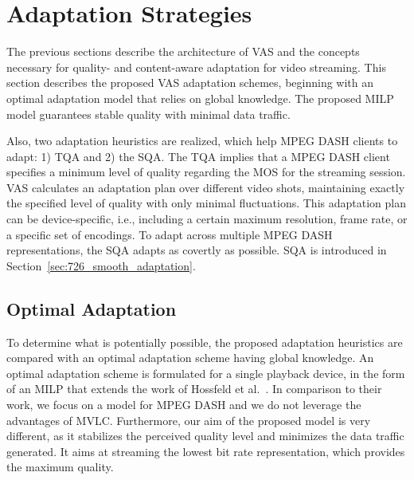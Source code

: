 \section{Adaptation Strategies}
\label{sec:726_adaptationstrategy}
The previous sections describe the architecture of \ac{VAS} and the concepts necessary for quality- and content-aware adaptation for video streaming.
This section describes the proposed \ac{VAS} adaptation schemes, beginning with an optimal adaptation model that relies on global knowledge.
The proposed \ac{MILP} model guarantees stable quality with minimal data traffic.

Also, two adaptation heuristics are realized, which help \ac{MPEG} \ac{DASH} clients to adapt: 1) \ac{TQA} and 2) the \ac{SQA}.
The \ac{TQA} implies that a \ac{MPEG} \ac{DASH} client specifies a minimum level of quality regarding the \ac{MOS} for the streaming session.
\ac{VAS} calculates an adaptation plan over different video shots, maintaining exactly the specified level of quality with only minimal fluctuations.
This adaptation plan can be device-specific, i.e., including a certain maximum resolution, frame rate, or a specific set of encodings.
To adapt across multiple \ac{MPEG} \ac{DASH} representations, the \acf{SQA} adapts as covertly as possible.
\ac{SQA} is introduced in Section~\ref{sec:726_smooth_adaptation}.
\subsection{Optimal Adaptation}
\label{sec:726_optimalAdaptation}
To determine what is potentially possible, the proposed adaptation heuristics are compared with an optimal adaptation scheme having global knowledge.
An optimal adaptation scheme is formulated for a single playback device, in the form of an \ac{MILP} that extends the work of Hossfeld et al.~\cite{Hossfeld2015a}.
In comparison to their work, we focus on a model for \ac{MPEG} \ac{DASH} and we do not leverage the advantages of \ac{MVLC}.
Furthermore, our aim of the proposed model is very different, as it stabilizes the perceived quality level and minimizes the data traffic generated.
It aims at streaming the lowest bit rate representation, which provides the maximum quality.


